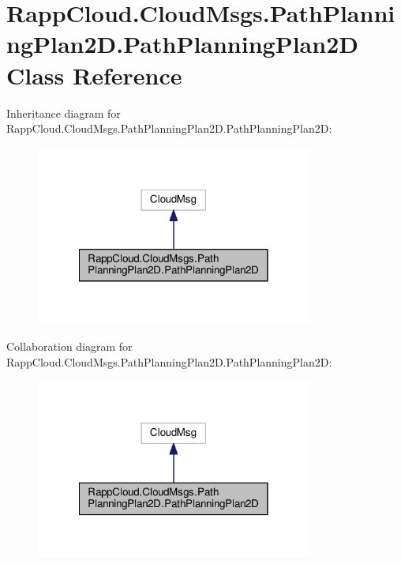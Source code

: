 \hypertarget{classRappCloud_1_1CloudMsgs_1_1PathPlanningPlan2D_1_1PathPlanningPlan2D}{\section{Rapp\-Cloud.\-Cloud\-Msgs.\-Path\-Planning\-Plan2\-D.\-Path\-Planning\-Plan2\-D Class Reference}
\label{classRappCloud_1_1CloudMsgs_1_1PathPlanningPlan2D_1_1PathPlanningPlan2D}
}


Inheritance diagram for Rapp\-Cloud.\-Cloud\-Msgs.\-Path\-Planning\-Plan2\-D.\-Path\-Planning\-Plan2\-D\-:
\nopagebreak
\begin{figure}[H]
\begin{center}
\leavevmode
\includegraphics[width=258pt]{classRappCloud_1_1CloudMsgs_1_1PathPlanningPlan2D_1_1PathPlanningPlan2D__inherit__graph}
\end{center}
\end{figure}


Collaboration diagram for Rapp\-Cloud.\-Cloud\-Msgs.\-Path\-Planning\-Plan2\-D.\-Path\-Planning\-Plan2\-D\-:
\nopagebreak
\begin{figure}[H]
\begin{center}
\leavevmode
\includegraphics[width=258pt]{classRappCloud_1_1CloudMsgs_1_1PathPlanningPlan2D_1_1PathPlanningPlan2D__coll__graph}
\end{center}
\end{figure}
